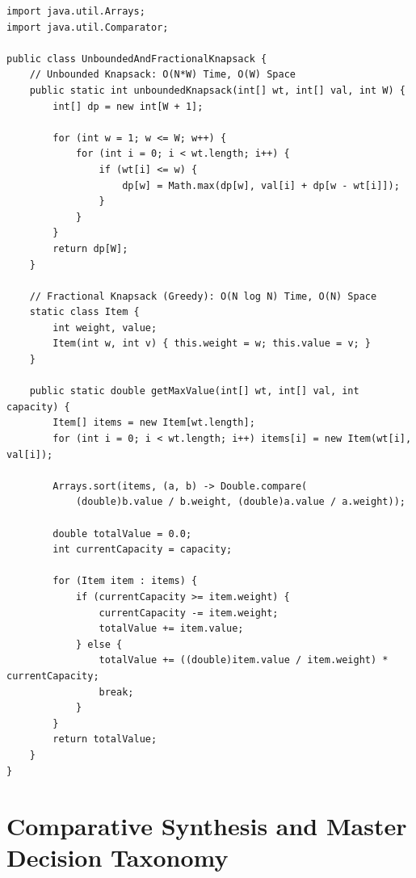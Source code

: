 \documentclass[10pt,journal,compsoc,onecolumn]{IEEEtran}
\begin{document}
\begin{verbatim}
import java.util.Arrays;
import java.util.Comparator;

public class UnboundedAndFractionalKnapsack {
    // Unbounded Knapsack: O(N*W) Time, O(W) Space
    public static int unboundedKnapsack(int[] wt, int[] val, int W) {
        int[] dp = new int[W + 1];

        for (int w = 1; w <= W; w++) {
            for (int i = 0; i < wt.length; i++) {
                if (wt[i] <= w) {
                    dp[w] = Math.max(dp[w], val[i] + dp[w - wt[i]]);
                }
            }
        }
        return dp[W];
    }

    // Fractional Knapsack (Greedy): O(N log N) Time, O(N) Space
    static class Item {
        int weight, value;
        Item(int w, int v) { this.weight = w; this.value = v; }
    }

    public static double getMaxValue(int[] wt, int[] val, int capacity) {
        Item[] items = new Item[wt.length];
        for (int i = 0; i < wt.length; i++) items[i] = new Item(wt[i], val[i]);

        Arrays.sort(items, (a, b) -> Double.compare(
            (double)b.value / b.weight, (double)a.value / a.weight));

        double totalValue = 0.0;
        int currentCapacity = capacity;

        for (Item item : items) {
            if (currentCapacity >= item.weight) {
                currentCapacity -= item.weight;
                totalValue += item.value;
            } else {
                totalValue += ((double)item.value / item.weight) * currentCapacity;
                break;
            }
        }
        return totalValue;
    }
}
\end{verbatim}


\section{Comparative Synthesis and Master Decision Taxonomy}
\label{sec:master-taxonomy}
\end{document}
